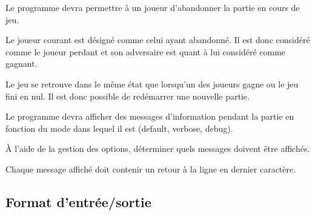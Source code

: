 \documentclass{article}
\begin{document}
\begin{needbox}[F32: Abandon]
    Le programme devra permettre à un joueur d’abandonner la partie en cours de jeu.
    \begin{subneedbox}[F32.1: Gagnant]
        Le joueur courant est désigné comme celui ayant abandonné.
        Il est donc considéré comme le joueur perdant et son adversaire
        est quant à lui considéré comme gagnant.
    \end{subneedbox}
    \begin{subneedbox}
        Le jeu se retrouve dans le même état que lorsqu'un des joueurs
        gagne ou le jeu fini en nul. Il est donc possible de redémarrer
        une nouvelle partie.
    \end{subneedbox}
\end{needbox}

\begin{needbox}
    Le programme devra afficher des messages d’information
    pendant la partie en fonction du mode dans lequel il est
    (default, verbose, debug).
    \begin{subneedbox}
        À l'aide de la gestion des options, déterminer quels messages doivent être affichés.
    \end{subneedbox}
    \begin{subneedbox}
        Chaque message affiché doit contenir un retour à la ligne en dernier caractère.
    \end{subneedbox}
\end{needbox}

\subsection{Format d'entrée/sortie}
\end{document}
